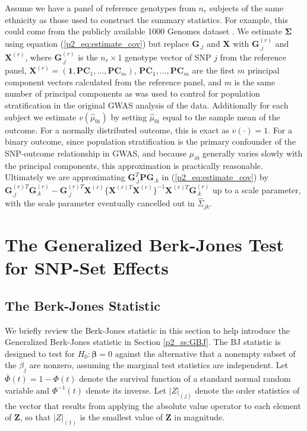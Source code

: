 \documentclass[12pt]{article}
\begin{document}
Assume we have a panel of reference genotypes from $n_{r}$ subjects of the same 
ethnicity as those used to construct the summary statistics. 
For example, this could come from the publicly available 1000 Genomes dataset 
\citep{1000_Genomes}.  
We estimate $\boldsymbol{\Sigma}$ using equation (\ref{p2_eq:estimate_cov}) but replace  
$\mathbf{G}_{.j}$ and $\mathbf{X}$ with $\mathbf{G}_{.j}^{(r)}$  and $\mathbf{X}^{(r)}$, 
where $\mathbf{G}_{.j}^{(r)}$ is the $n_{r}\times 1$ genotype vector of SNP $j$ from 
the reference panel,   
$\mathbf{X}^{(r)}=\left(\mathbf{1}, \mathbf{PC}_{1},..., \mathbf{PC}_{m}\right)$, $\mathbf{PC}_{1},...,\mathbf{PC}_{m}$
are the first $m$ principal component vectors calculated from the reference panel, and 
$m$ is the same number of principal components as was used to control for population 
stratification \citep{Eigenstrat} in the original GWAS analysis of the data.  
Additionally for each subject we estimate $v(\widehat\mu_{0i})$ by setting $\widehat{\mu}_{0i}$ 
equal to the sample mean of the outcome. 
For a normally distributed outcome, this is exact as $v(\cdot)=1$. 
For a binary outcome, since population stratification is the primary confounder of the 
SNP-outcome relationship in GWAS, and because $\mu_{i0}$ generally varies slowly with the 
principal components, this approximation is practically reasonable. 
Ultimately we are approximating $\mathbf{G}_{.j}^{T}\mathbf{P}\mathbf{G}_{.k}$ in 
(\ref{p2_eq:estimate_cov}) by $\mathbf{G}_{.j}^{(r)T}\mathbf{G}_{.k}^{(r)}-\mathbf{G}_{.j}^{(r)T}\mathbf{X}^{(r)}
\{\mathbf{X}^{(r)T}\mathbf{X}^{(r)}\}^{-1}\mathbf{X}^{(r)T}\mathbf{G}_{.k}^{(r)}$ up to a scale 
parameter, with the scale parameter eventually cancelled out in $\widehat{\Sigma}_{jk}$.




\section{The Generalized Berk-Jones Test for SNP-Set Effects}
\label{p2_sec:GBJ}

\subsection{The Berk-Jones Statistic}
\label{p2_ss::BJ}
We briefly review the Berk-Jones statistic in this section to help introduce the Generalized 
Berk-Jones statistic in Section \ref{p2_ss:GBJ}. 
The BJ statistic is designed to test for $H_0: \boldsymbol{\beta}=0$  against the alternative 
that a nonempty subset of the $\beta_j$ are nonzero, assuming the marginal test statistics 
are independent.
Let $\bar{\Phi}(t)=1-\Phi(t)$ denote the survival function of a standard normal random variable 
and $\Phi^{-1}(t)$ denote its inverse.
Let $|Z|_{(j)}$ denote the order statistics of the vector that results from applying the absolute 
value operator to each element of $\mathbf{Z}$, so that $|Z|_{(1)}$ is the smallest value of 
$\mathbf{Z}$ in magnitude. 
\end{document}
